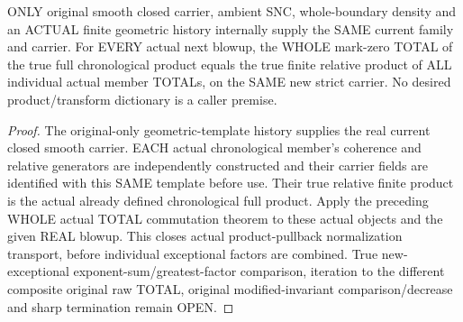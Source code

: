 \begin{theorem}
\label{hir:sharp-original-chronological-product-whole-total-transport}
\leanok
ONLY original smooth closed carrier, ambient SNC, whole-boundary density
and an ACTUAL finite geometric history internally supply the SAME current
family and carrier. For EVERY actual next blowup, the WHOLE mark-zero TOTAL
of the true full chronological product equals the true finite relative
product of ALL individual actual member TOTALs, on the SAME new strict
carrier. No desired product/transform dictionary is a caller premise.
\end{theorem}
\begin{proof}
The original-only geometric-template history supplies the real current
closed smooth carrier. EACH actual chronological member's coherence and
relative generators are independently constructed and their carrier fields
are identified with this SAME template before use. Their true relative
finite product is the actual already defined chronological full product.
Apply the preceding WHOLE actual TOTAL commutation theorem to these actual
objects and the given REAL blowup. This closes actual product-pullback
normalization transport, before individual exceptional factors are combined.
True new-exceptional exponent-sum/greatest-factor comparison, iteration to
the different composite original raw TOTAL, original modified-invariant
comparison/decrease and sharp termination remain OPEN.
\end{proof}
